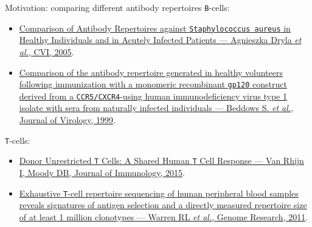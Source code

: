 \documentclass{beamer}\usepackage[]{graphicx}\usepackage[]{color}
\begin{document}
\begin{frame}{Motivation: comparing different antibody repertoires}
  \texttt{B}-cells:
  {\footnotesize
  \begin{itemize}
    \item \href{http://www.ncbi.nlm.nih.gov/pmc/articles/PMC1065207/}{Comparison of Antibody Repertoires against \texttt{Staphylococcus aureus} in 
      Healthy Individuals and in Acutely Infected Patients --- Agnieszka Dryla \textit{et al.}, CVI, 2005}.
  
    \item \href{http://www.ncbi.nlm.nih.gov/pubmed/9882391}{Comparison of the antibody repertoire generated in healthy volunteers following immunization with a monomeric recombinant \texttt{gp120} 
      construct derived from a \texttt{CCR5/CXCR4}-using human immunodeficiency virus type 1 isolate with sera from naturally infected individuals --- Beddows S. \textit{et al.}, Journal of Virology, 1999}. 
  \end{itemize}
  }

  \bigskip
  \texttt{T}-cells:
  
  { \footnotesize
  \begin{itemize}
    \item \href{http://www.ncbi.nlm.nih.gov/pubmed/26297792}{Donor Unrestricted \texttt{T} Cells: A Shared Human \texttt{T} Cell Response --- Van Rhijn I, Moody DB, Journal of Immunology, 2015}.
    \item \href{http://www.ncbi.nlm.nih.gov/pubmed/21349924}{Exhaustive \texttt{T}-cell repertoire sequencing of human peripheral blood samples reveals 
      signatures of antigen selection and a directly measured repertoire size of at least 1 million clonotypes --- Warren RL \textit{et al.}, Genome Research, 2011}.
  \end{itemize}
  }
\end{frame}
\end{document}
